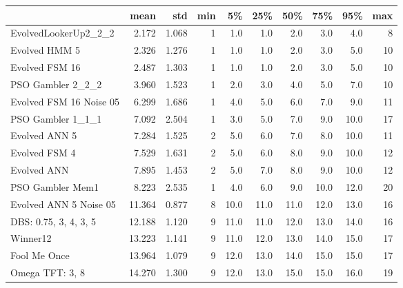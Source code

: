\begin{tabular}{lrrrrrrrrr}
\toprule
{} &    mean &    std &  min &    5\% &   25\% &   50\% &   75\% &   95\% &  max \\
\midrule
EvolvedLookerUp2\_2\_2    &   2.172 &  1.068 &    1 &   1.0 &   1.0 &   2.0 &   3.0 &   4.0 &    8 \\
Evolved HMM 5           &   2.326 &  1.276 &    1 &   1.0 &   1.0 &   2.0 &   3.0 &   5.0 &   10 \\
Evolved FSM 16          &   2.487 &  1.303 &    1 &   1.0 &   1.0 &   2.0 &   3.0 &   5.0 &   10 \\
PSO Gambler 2\_2\_2       &   3.960 &  1.523 &    1 &   2.0 &   3.0 &   4.0 &   5.0 &   7.0 &   10 \\
Evolved FSM 16 Noise 05 &   6.299 &  1.686 &    1 &   4.0 &   5.0 &   6.0 &   7.0 &   9.0 &   11 \\
PSO Gambler 1\_1\_1       &   7.092 &  2.504 &    1 &   3.0 &   5.0 &   7.0 &   9.0 &  10.0 &   17 \\
Evolved ANN 5           &   7.284 &  1.525 &    2 &   5.0 &   6.0 &   7.0 &   8.0 &  10.0 &   11 \\
Evolved FSM 4           &   7.529 &  1.631 &    2 &   5.0 &   6.0 &   8.0 &   9.0 &  10.0 &   12 \\
Evolved ANN             &   7.895 &  1.453 &    2 &   5.0 &   7.0 &   8.0 &   9.0 &  10.0 &   12 \\
PSO Gambler Mem1        &   8.223 &  2.535 &    1 &   4.0 &   6.0 &   9.0 &  10.0 &  12.0 &   20 \\
Evolved ANN 5 Noise 05  &  11.364 &  0.877 &    8 &  10.0 &  11.0 &  11.0 &  12.0 &  13.0 &   16 \\
DBS: 0.75, 3, 4, 3, 5   &  12.188 &  1.120 &    9 &  11.0 &  11.0 &  12.0 &  13.0 &  14.0 &   16 \\
Winner12                &  13.223 &  1.141 &    9 &  11.0 &  12.0 &  13.0 &  14.0 &  15.0 &   17 \\
Fool Me Once            &  13.964 &  1.079 &    9 &  12.0 &  13.0 &  14.0 &  15.0 &  15.0 &   17 \\
Omega TFT: 3, 8         &  14.270 &  1.300 &    9 &  12.0 &  13.0 &  15.0 &  15.0 &  16.0 &   19 \\
\bottomrule
\end{tabular}
